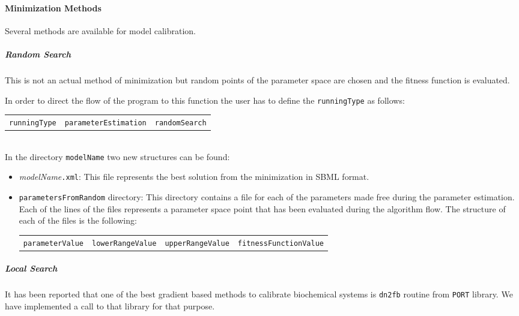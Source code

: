 \documentclass[a4paper, 11pt]{article}
\begin{document}
\paragraph{Minimization Methods} \label{minimizationMethods}
Several methods are available for model calibration.
\subparagraph{Random Search} \label{randomSearch}
This is not an actual method of minimization but random points of the parameter space are chosen and the fitness function is evaluated.

In order to direct the flow of the program to this function the user has to define the \texttt{runningType} as follows:\\[1.5ex]
\begin{tabular}{ccc}\texttt{runningType}&\texttt{parameterEstimation}&\texttt{randomSearch}\end{tabular}\\[1.5ex]
In the directory \texttt{modelName} two new structures can be found:
\begin{itemize}
  \item \textit{modelName}\texttt{.xml}: 
    This file represents the best solution from the minimization in SBML format.
  \item \texttt{parametersFromRandom} directory:
    This directory contains a file for each of the parameters made free during the parameter estimation.
    Each of the lines of the files represents a parameter space point that has been evaluated during the algorithm flow.
    The structure of each of the files is the following:\\[1.5ex]
    \begin{tabular}{cccc}\texttt{parameterValue}&\texttt{lowerRangeValue}&\texttt{upperRangeValue}&\texttt{fitnessFunctionValue}\end{tabular}
\end{itemize}
\subparagraph{Local Search} 
It has been reported \citep{rodriguez-fernandez06} that one of the best gradient based methods to calibrate biochemical systems is \texttt{dn2fb} routine from \texttt{PORT} library.
We have implemented a call to that library for that purpose.
\end{document}
